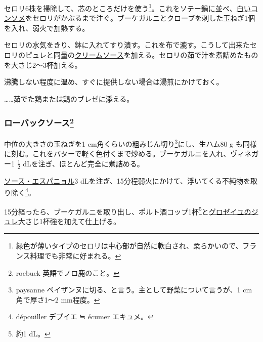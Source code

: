 \begin{recette}
セロリ6株を掃除して、芯のところだけを使う\footnote{緑色が薄いタイプのセロリは中心部が自然に軟白され、柔らかいので、フランス料理でも非常に好まれる。}。これをソテー鍋に並べ、\protect\hyperlink{}{白いコンソメ}をセロリがかぶるまで注ぐ。ブーケガルニとクローブを刺した玉ねぎ1個を入れ、弱火で加熱する。

セロリの水気をきり、鉢に入れてすり潰す。これを布で漉す。こうして出来たセロリのピュレと同量の\protect\hyperlink{cream-sauce}{クリームソース}を加える。セロリの茹で汁を煮詰めたものを大さじ2〜3杯加える。

沸騰しない程度に温め、すぐに提供しない場合は湯煎にかけておく。

\ldots{}\ldots{}茹でた鶏または鶏のブレゼに添える。

\hypertarget{roe-buck-sauce}{%
\subsubsection[ローバックソース]{\texorpdfstring{ローバックソース\footnote{roebuck
  英語でノロ鹿のこと。}}{ローバックソース}}\label{roe-buck-sauce}}



中位の大きさの玉ねぎを1 cm角くらいの粗みじん切り\footnote{paysanne
  ペイザンヌに切る、と言う。主として野菜について言うが、1 cm角で厚さ1〜2
  mm程度。}にし、生ハム80 g
も同様に刻む。これをバターで軽く色付くまで炒める。ブーケガルニを入れ、ヴィネガー1
\(\frac{1}{2}\) dLを注ぎ、ほとんど完全に煮詰める。

\protect\hyperlink{sauce-espagnole}{ソース・エスパニョル}3
dLを注ぎ、15分程弱火にかけて、浮いてくる不純物を取り除く\footnote{dépouiller
  デプイエ ≒ écumer エキュメ。}。

15分経ったら、ブーケガルニを取り出し、ポルト酒コップ1杯\footnote{約1
  dL。}と\protect\hyperlink{}{グロゼイユのジュレ}大さじ1杯強を加えて仕上げる。


\end{recette}
